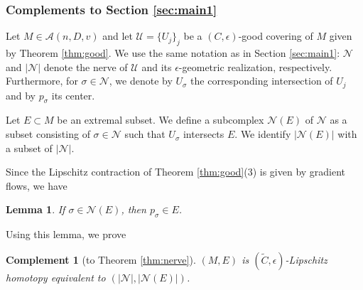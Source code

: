 \documentclass[a4paper,12pt]{amsart}
\theoremstyle{plain}
\newtheorem{lem}[thm]{Lemma}
\newtheorem{comp}[thm]{Complement}
\theoremstyle{definition}
\numberwithin{thm}{section}
\numberwithin{equation}{section}
\begin{document}
\subsubsection{Complements to Section \ref{sec:main1}}

Let $M\in\mathcal A(n,D,v)$ and let $\mathcal U=\{U_j\}_j$ be a $(C,\epsilon)$-good covering of $M$ given by Theorem \ref{thm:good}.
We use the same notation as in Section \ref{sec:main1}: $\mathcal N$ and $|\mathcal N|$ denote the nerve of $\mathcal U$ and its $\epsilon$-geometric realization, respectively.
Furthermore, for $\sigma\in\mathcal N$, we denote by $U_\sigma$ the corresponding intersection of $U_j$ and by $p_\sigma$ its center.

Let $E\subset M$ be an extremal subset.
We define a subcomplex $\mathcal N(E)$ of $\mathcal N$ as a subset consisting of $\sigma\in\mathcal N$ such that $U_\sigma$ intersects $E$.
We identify $|\mathcal N(E)|$ with a subset of $|\mathcal N|$.

Since the Lipschitz contraction of Theorem \ref{thm:good}(3) is given by gradient flows, we have

\begin{lem}\label{lem:cen}
If $\sigma\in\mathcal N(E)$, then $p_\sigma\in E$.
\end{lem}

Using this lemma, we prove

\begin{comp}[to Theorem \ref{thm:nerve}]\label{comp:nerve}
$(M,E)$ is $(\tilde C,\epsilon)$-Lipschitz homotopy equivalent to $(|\mathcal N|,|\mathcal N(E)|)$.
\end{comp}
\end{document}
